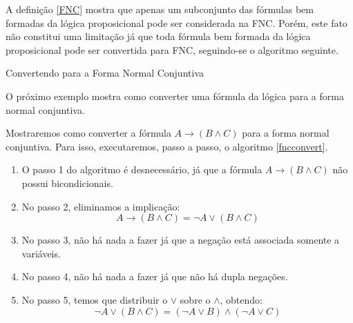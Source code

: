 A definição \ref{FNC} mostra que apenas um subconjunto das fórmulas
bem formadas da lógica proposicional pode ser considerada na
FNC. Porém, este fato não constitui uma limitação já que toda fórmula
bem formada da lógica proposicional pode ser convertida para FNC,
seguindo-se o algoritmo seguinte.
\begin{algorithm}
  \begin{algorithmic}[1]
     \EndFor
  \end{algorithmic}
  \caption{Convertendo para a Forma Normal Conjuntiva}
  \label{fncconvert}
\end{algorithm}
O próximo exemplo mostra como converter uma fórmula da lógica para a
forma normal conjuntiva.
\begin{Example}
Mostraremos como converter a fórmula $A\to (B\land C)$ para a forma
normal conjuntiva. Para isso, executaremos, passo a passo, o algoritmo
\ref{fncconvert}.
\begin{enumerate}
  \item O passo 1 do algoritmo é desnecessário, já que a fórmula $A
    \to (B\land C)$ não possui bicondicionais.
  \item No passo 2, eliminamos a implicação:
    \[A \to (B\land C) = \neg A \lor (B\land C)\]
  \item No passo 3, não há nada a fazer já que a negação está
    associada somente a variáveis.
   \item No passo 4, não há nada a fazer já que não há dupla negações.
   \item No passo 5, temos que distribuir o $\lor$ sobre o $\land$,
     obtendo: \[\neg A \lor (B\land C) = (\neg A \lor B)\land (\neg A
     \lor C)\]
\end{enumerate}
\end{Example}
